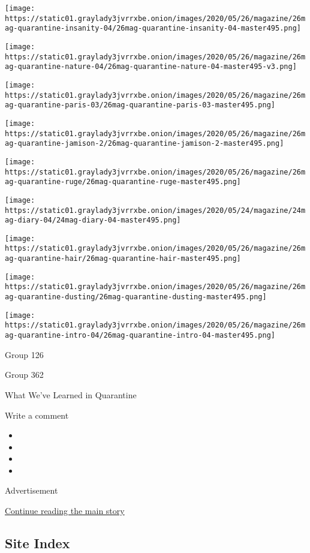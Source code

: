 \texttt{[image: https://static01.graylady3jvrrxbe.onion/images/2020/05/26/magazine/26mag-quarantine-insanity-04/26mag-quarantine-insanity-04-master495.png]}

\texttt{[image: https://static01.graylady3jvrrxbe.onion/images/2020/05/26/magazine/26mag-quarantine-nature-04/26mag-quarantine-nature-04-master495-v3.png]}

\texttt{[image: https://static01.graylady3jvrrxbe.onion/images/2020/05/26/magazine/26mag-quarantine-paris-03/26mag-quarantine-paris-03-master495.png]}

\texttt{[image: https://static01.graylady3jvrrxbe.onion/images/2020/05/26/magazine/26mag-quarantine-jamison-2/26mag-quarantine-jamison-2-master495.png]}

\texttt{[image: https://static01.graylady3jvrrxbe.onion/images/2020/05/26/magazine/26mag-quarantine-ruge/26mag-quarantine-ruge-master495.png]}

\texttt{[image: https://static01.graylady3jvrrxbe.onion/images/2020/05/24/magazine/24mag-diary-04/24mag-diary-04-master495.png]}

\texttt{[image: https://static01.graylady3jvrrxbe.onion/images/2020/05/26/magazine/26mag-quarantine-hair/26mag-quarantine-hair-master495.png]}

\texttt{[image: https://static01.graylady3jvrrxbe.onion/images/2020/05/26/magazine/26mag-quarantine-dusting/26mag-quarantine-dusting-master495.png]}

\texttt{[image: https://static01.graylady3jvrrxbe.onion/images/2020/05/26/magazine/26mag-quarantine-intro-04/26mag-quarantine-intro-04-master495.png]}

Group 126

Group 362

What We've Learned in Quarantine

Write a comment

\begin{itemize}
\item
\item
\item
\item
\end{itemize}

Advertisement

\protect\hyperlink{after-bottom}{Continue reading the main story}

\hypertarget{site-index}{%
\subsection{Site Index}\label{site-index}}

